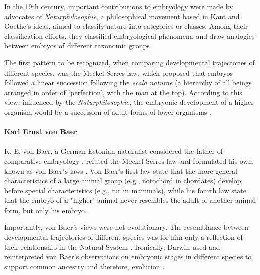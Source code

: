 \clearpage
\begin{mdframed}[style=boxstyle,frametitle={Box2. Haeckel, von Baer and the \textit{Naturphilosophie}}]\label{Box2:Naturphilosophie}

In the 19th century, important contributions to embryology were made by advocates of \textit{Naturphilosophie}, a philosophical movement based in Kant and Goethe's ideas, aimed to classify nature into categories or classes.
Among their classification efforts, they classified embryological phenomena and draw analogies between embryos of different taxonomic groups \citep{Horder2010,Ghiselin2005}.

The first pattern to be recognized, when comparing developmental trajectories of different species, was the Meckel-Serres law,
  which proposed that embryos followed a linear succession following the \textit{scala naturae} (a hierarchy of all beings arranged in order of `perfection', with the man at the top).
According to this view, influenced by the \textit{Naturphilosophie}, the embryonic development of a higher organism would be a succession of adult forms of lower organisms \citep{Russell1916,amundson2005changing}.

\paragraph{Karl Ernst von Baer} \label{vonBaer}
K. E. von Baer, a German-Estonian naturalist considered the father of comparative embryology \citep{Russell1916}, refuted the Meckel-Serres law and formulated his own, known as von Baer's laws \citep{vonBaer1828uber}. 
Von Baer's first law state that the more general characteristics of a large animal group (e.g., notochord in chordates) develop before special characteristics (e.g., fur in mammals), while his fourth law state that the embryo of a "higher" animal never resembles the adult of another animal form, but only his embryo. 

Importantly, von Baer's views were not evolutionary. The resemblance between developmental trajectories of different species was for him only a reflection of their relationship in the Natural System \citep{amundson2005changing}.
Ironically, Darwin used and reinterpreted von Baer's observations on embryonic stages in different species to support common ancestry and therefore, evolution \citep{darwin1859origin}.


\end{mdframed}
